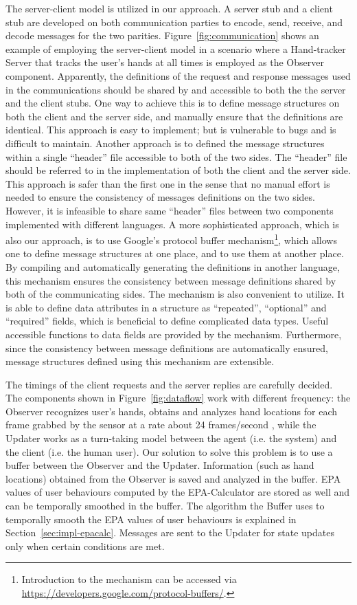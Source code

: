 The server-client model is utilized in our approach. A server stub and a client stub are developed on both communication parties to encode, send, receive, and decode messages for the two parities. Figure~\ref{fig:communication} shows an example of employing the server-client model in a scenario where a Hand-tracker Server that tracks the user's hands at all times is employed as the Observer component. Apparently, the definitions of the request and response messages used in the communications should be shared by and accessible to both the  the server and the client stubs. One way to achieve this is to define message structures on both the client and the server side, and manually ensure that the definitions are identical. This approach is easy to implement; but is vulnerable to bugs and is difficult to maintain. Another approach is to defined the message structures within a single ``header'' file accessible to both of the two sides. The ``header'' file should be referred to in the implementation of both the client and the server side. This approach is safer than the first one in the sense that no manual effort is needed to ensure the consistency of messages definitions on the two sides. However, it is infeasible to share same ``header'' files between two components implemented with different languages. A more sophisticated approach, which is also our approach, is to use Google's protocol buffer mechanism\footnote{Introduction to the mechanism can be accessed via \url{https://developers.google.com/protocol-buffers/}.}, which allows one to define message structures at one place, and to use them at another place. By compiling and automatically generating the definitions in another language, this mechanism ensures the consistency between message definitions shared by both of the communicating sides. The mechanism is also convenient to utilize. It is able to define data attributes in a structure as ``repeated'', ``optional'' and ``required'' fields, which is beneficial to define complicated data types. Useful accessible functions to data fields are provided by the mechanism. Furthermore, since the consistency between message definitions are automatically ensured, message structures defined using this mechanism are extensible.

The timings of the client requests and the server replies are carefully decided. The components shown in Figure~\ref{fig:dataflow} work with different frequency: the Observer recognizes user's hands, obtains and analyzes hand locations for each frame grabbed by the sensor at a rate about 24 frames/second , while the Updater works as a turn-taking model between the agent (i.e. the system) and the client (i.e. the human user). Our solution to solve this problem is to use a buffer between the Observer and the Updater. Information (such as hand locations) obtained from the Observer is saved and analyzed in the buffer. EPA values of user behaviours computed by the EPA-Calculator are stored as well and can be temporally smoothed in the buffer. The algorithm the Buffer uses to temporally smooth the EPA values of user behaviours is explained in Section~\ref{sec:impl-epacalc}. Messages are sent to the Updater for state updates only when certain conditions are met. 

